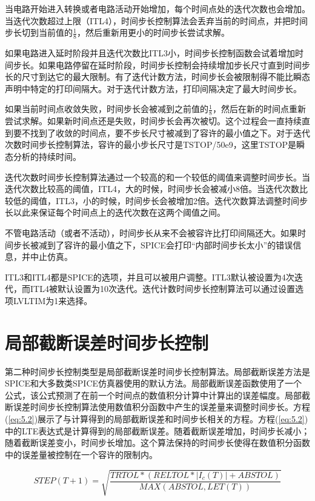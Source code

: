 当电路开始进入转换或者电路活动开始增加，每个时间点处的迭代次数也会增加。当迭代次数超过上限（ITL4），时间步长控制算法会丢弃当前的时间点，并把时间步长切到当前值的$\frac{1}{8}$，然后重新用更小的时间步长尝试求解。

如果电路进入延时阶段并且迭代次数比ITL3小，时间步长控制函数会试着增加时间步长。如果电路停留在延时阶段，时间步长控制会持续增加步长尺寸直到时间步长的尺寸到达它的最大限制。有了迭代计数方法，时间步长会被限制得不能比瞬态声明中特定的打印间隔大。对于迭代计数方法，打印间隔决定了最大时间步长。

如果当前时间点收敛失败，时间步长会被减到之前值的$\frac{1}{8}$，然后在新的时间点重新尝试求解。如果新时间点还是失败，时间步长会再次被切。这个过程会一直持续直到要不找到了收敛的时间点，要不步长尺寸被减到了容许的最小值之下。对于迭代次数时间步长控制算法，容许的最小步长尺寸是TSTOP/50e9，这里TSTOP是瞬态分析的持续时间。

迭代次数时间步长控制算法通过一个较高的和一个较低的阈值来调整时间步长。当迭代次数比较高的阈值，ITL4，大的时候，时间步长会被减小8倍。当迭代次数比较低的阈值，ITL3，小的时候，时间步长会被增加2倍。迭代次数算法调整时间步长以此来保证每个时间点上的迭代次数在这两个阈值之间。

不管电路活动（或者不活动），时间步长从来不会被容许比打印间隔还大。如果时间步长被减到了容许的最小值之下，SPICE会打印“内部时间步长太小”的错误信息，并中止仿真。

ITL3和ITL4都是SPICE的选项，并且可以被用户调整。ITL3默认被设置为4次迭代，而ITL4被默认设置为10次迭代。迭代计数时间步长控制算法可以通过设置选项LVLTIM为1来选择。

\section{局部截断误差时间步长控制}
第二种时间步长控制类型是局部截断误差时间步长控制算法。局部截断误差方法是SPICE和大多数类SPICE仿真器使用的默认方法。局部截断误差函数使用了一个公式，该公式预测了在前一个时间点的数值积分计算中计算出的误差幅度。局部截断误差时间步长控制算法使用数值积分函数中产生的误差量来调整时间步长。方程(\ref{eq:5.2})展示了与计算得到的局部截断误差和时间步长相关的方程。方程(\ref{eq:5.2})中的LTE表达式是计算得到的局部截断误差。随着截断误差增加，时间步长减小；随着截断误差变小，时间步长增加。这个算法保持的时间步长使得在数值积分函数中的误差量被控制在一个容许的限制内。

\begin{equation}
    STEP(T+1)=\sqrt{\frac{TRTOL*(RELTOL*|I_c(T)|+ABSTOL)}{MAX(ABSTOL, LET(T))}}
    \label{eq:5.2}
\end{equation}

